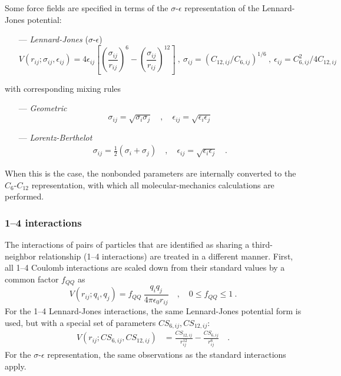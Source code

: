 \documentclass[10pt,a4paper,openany]{memoir}
\numberwithin{equation}{section}
\begin{document}
Some force fields are specified in terms of the
$\sigma$-$\epsilon$ representation of the Lennard-Jones potential:
\begin{itemize}
  \item [---] \textit{Lennard-Jones} ($\sigma$-$\epsilon$)
\begin{equation}
  \label{eq:lj-sigma-epsilon-term}
  V(r_{ij}; \sigma_{ij}, \epsilon_{ij}) = 4\epsilon_{ij}\left[ \left(\frac{\sigma_{ij}}{r_{ij}}\right)^{6} - \left(\frac{\sigma_{ij}}{r_{ij}}\right)^{12}   \right] \ , \ \sigma_{ij} = (C_{12,ij}/C_{6,ij})^{1/6} \ , \ \epsilon_{ij} = C_{6,ij}^2/4C_{12,ij}
\end{equation}
\end{itemize}
with corresponding mixing rules
\begin{itemize}
\item [---] \textit{Geometric}
  \begin{equation}
    \label{eq:geometric-mix-sigma-epsilon}
  \sigma_{ij} = \sqrt{\sigma_i \sigma_j} \quad , \quad \epsilon_{ij} = \sqrt{\epsilon_i \epsilon_j}
  \end{equation}
\item [---]\textit{Lorentz-Berthelot}
  \begin{align}
    \label{eq:lorentz-mix-sigma-epsilon}
  \sigma_{ij} = \frac{1}{2}(\sigma_i + \sigma_j) \quad , \quad \epsilon_{ij} = \sqrt{\epsilon_i \epsilon_j} \quad .
  \end{align}
\end{itemize}
When this is the case, the nonbonded parameters are internally converted to the $C_6$-$C_{12}$ representation, with which all molecular-mechanics calculations are performed.

\subsubsection{1--4 interactions}
\label{sec:1-4-interactions}

The interactions of pairs of particles that are identified as sharing
a third-neighbor relationship (1--4 interactions) are treated in a
different manner. First, all 1--4 Coulomb interactions are scaled down from
their standard values by a common factor $f_{QQ}$ as
\begin{equation}
  \label{eq:fudge-QQ}
    V(r_{ij};q_i,q_j) = f_{QQ}\ \frac{q_i q_j}{4\pi\epsilon_0 r_{ij}} \quad , \quad 0 \leq f_{QQ} \leq 1\ .
\end{equation}
For the 1--4 Lennard-Jones interactions, the same Lennard-Jones
potential form is used, but with a special set of parameters
$CS_{6,ij},CS_{12,ij}$:
\begin{align}
  \label{eq:lj-term-14}
      V(r_{ij};CS_{6,ij},CS_{12,ij}) & = \frac{CS_{12,ij}}{r_{ij}^{12}} - \frac{CS_{6,ij}}{r_{ij}^6} \quad .
\end{align}
For the $\sigma$-$\epsilon$ representation, the same observations as the standard interactions apply.
\end{document}
